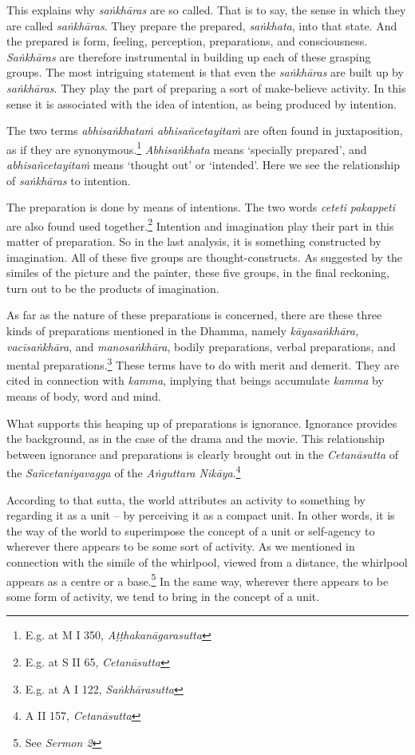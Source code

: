 This explains why \emph{saṅkhāras} are so called. That is to say, the sense in which they are called \emph{saṅkhāras}. They prepare the prepared, \emph{saṅkhata}, into that state. And the prepared is form, feeling, perception, preparations, and consciousness. \emph{Saṅkhāras} are therefore instrumental in building up each of these grasping groups. The most intriguing statement is that even the \emph{saṅkhāras} are built up by \emph{saṅkhāras}. They play the part of preparing a sort of make-believe activity. In this sense it is associated with the idea of intention, as being produced by intention.

The two terms \emph{abhisaṅkhataṁ abhisañcetayitaṁ} are often found in juxtaposition, as if they are synonymous.\footnote{E.g. at M I 350, \emph{Aṭṭhakanāgarasutta}} \emph{Abhisaṅkhata} means `specially prepared', and \emph{abhisañcetayitaṁ} means `thought out' or `intended'. Here we see the relationship of \emph{saṅkhāras} to intention.

The preparation is done by means of intentions. The two words \emph{ceteti} \emph{pakappeti} are also found used together.\footnote{E.g. at S II 65, \emph{Cetanāsutta}} Intention and imagination play their part in this matter of preparation. So in the last analysis, it is something constructed by imagination. All of these five groups are thought-constructs. As suggested by the similes of the picture and the painter, these five groups, in the final reckoning, turn out to be the products of imagination.

As far as the nature of these preparations is concerned, there are these three kinds of preparations mentioned in the Dhamma, namely \emph{kāyasaṅkhāra, vacīsaṅkhāra}, and \emph{manosaṅkhāra}, bodily preparations, verbal preparations, and mental preparations.\footnote{E.g. at A I 122, \emph{Saṅkhārasutta}} These terms have to do with merit and demerit. They are cited in connection with \emph{kamma}, implying that beings accumulate \emph{kamma} by means of body, word and mind.

What supports this heaping up of preparations is ignorance. Ignorance provides the background, as in the case of the drama and the movie. This relationship between ignorance and preparations is clearly brought out in the \emph{Cetanāsutta} of the \emph{Sañcetaniyavagga} of the \emph{Aṅguttara Nikāya}.\footnote{A II 157, \emph{Cetanāsutta}}

According to that sutta, the world attributes an activity to something by regarding it as a unit -- by perceiving it as a compact unit. In other words, it is the way of the world to superimpose the concept of a unit or self-agency to wherever there appears to be some sort of activity. As we mentioned in connection with the simile of the whirlpool, viewed from a distance, the whirlpool appears as a centre or a base.\footnote{See \emph{Sermon 2}} In the same way, wherever there appears to be some form of activity, we tend to bring in the concept of a unit.

